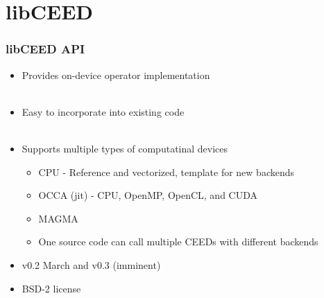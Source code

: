 \documentclass{beamer}
\begin{document}
\section{libCEED}

\begin{frame}
\begin{center}
\frametitle{libCEED API}

\begin{itemize}

\item Provides on-device operator implementation\\

~\\

\item Easy to incorporate into existing code\\

~\\

\item Supports multiple types of computatinal devices\\

\begin{itemize}

\item CPU - Reference and vectorized, template for new backends

\item OCCA (jit) - CPU, OpenMP, OpenCL, and CUDA

\item MAGMA

\item One source code can call multiple CEEDs with different backends

\end{itemize}

\item v0.2 March and v0.3 (imminent)\\

\item BSD-2 license

\end{itemize}

\end{center}
\end{frame}

\end{document}

